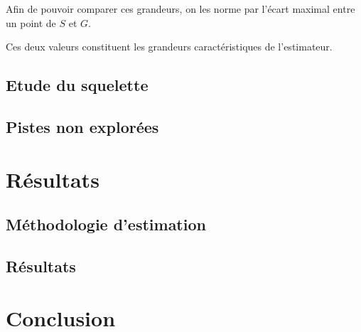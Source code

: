 \documentclass{article}
\theoremstyle{definition}
\begin{document}
      Afin de pouvoir comparer ces grandeurs, on les norme par l'écart maximal entre un point de $S$ et $G$.
      
      Ces deux valeurs constituent les grandeurs caractéristiques de l'estimateur.
    
    \subsection{Etude du squelette} %
    
    \subsection{Pistes non explorées}
  
  \section{Résultats} 
  
    \subsection{Méthodologie d'estimation}  %
    
    \subsection{Résultats} %
  
  \section{Conclusion}
  
\end{document}
